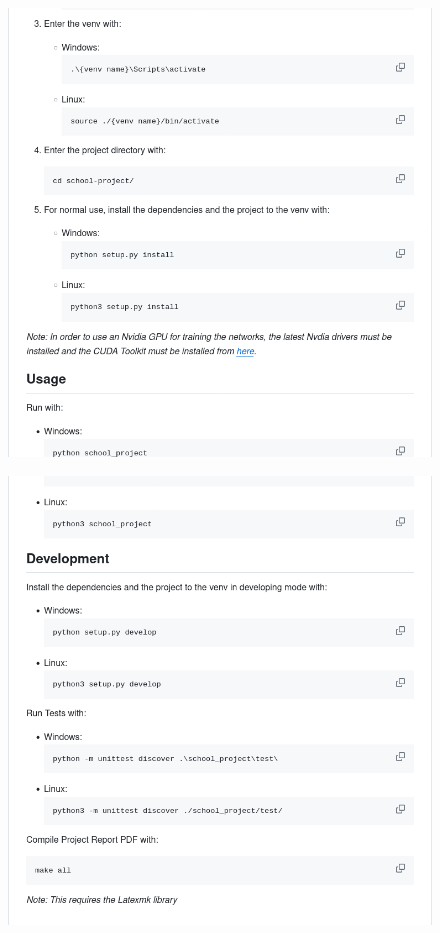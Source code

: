 \documentclass[./project-report/src/latex/project-report.tex]{subfiles}
\begin{document}
\begin{itemize}
\begin{itemize}
\begin{figure}[h!]
                \end{figure}
                \pagebreak
                \begin{figure}[h!]
                \centering
                \includegraphics[width=1\textwidth]{./project-report/src/images/readme-middle.png}
                \end{figure}
                \pagebreak
                \begin{figure}[h!]
                \centering
                \includegraphics[width=1\textwidth]{./project-report/src/images/readme-bottom.png}

\end{figure}
\end{itemize}
\end{itemize}
\end{document}
